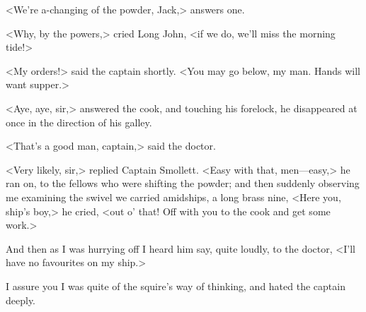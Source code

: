 <We're a-changing of the powder, Jack,> answers one.

<Why, by the powers,> cried Long John, <if we do, we'll miss the morning tide!>

<My orders!> said the captain shortly. <You may go below, my man. Hands will want supper.>

<Aye, aye, sir,> answered the cook, and touching his forelock, he disappeared at once in the direction of his galley.

<That's a good man, captain,> said the doctor.

<Very likely, sir,> replied Captain Smollett. <Easy with that, men—easy,> he ran on, to the fellows who were shifting the powder; and then suddenly observing me examining the swivel we carried amidships, a long brass nine, <Here you, ship's boy,> he cried, <out o' that! Off with you to the cook and get some work.>


And then as I was hurrying off I heard him say, quite loudly, to the doctor, <I'll have no favourites on my ship.>

I assure you I was quite of the squire's way of thinking, and hated the captain deeply.